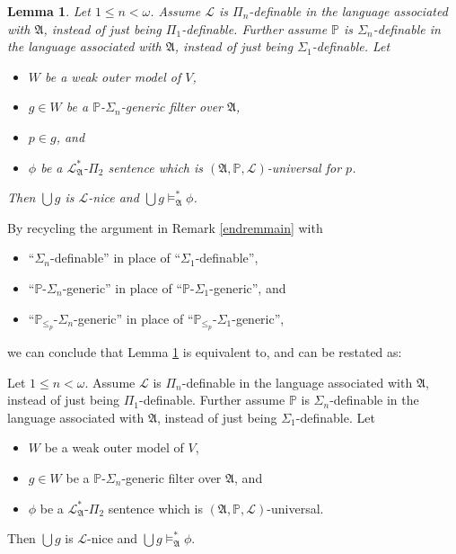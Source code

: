\documentclass[12pt, twoside]{memoir}
\numberwithin{equation}{section}
\newtheorem{lem}[thm]{Lemma}
\theoremstyle{definition}
\theoremstyle{remark}
\theoremstyle{definition}
\theoremstyle{definition}
\newenvironment{customlem}[1]
  {\renewcommand\theinnercustomlem{#1}\innercustomlem}
  {\endinnercustomlem}
\theoremstyle{definition}
\theoremstyle{remark}
\begin{document}
\begin{lem}\label{lem332}
Let $1 \leq n < \omega$. Assume $\mathcal{L}$ is $\Pi_n$-definable in the language associated with $\mathfrak{A}$, instead of just being $\Pi_1$-definable. Further assume $\mathbb{P}$ is $\Sigma_n$-definable in the language associated with $\mathfrak{A}$, instead of just being $\Sigma_1$-definable. Let 
\begin{itemize} 
    \item $W$ be a weak outer model of $V$,
    \item $g \in W$ be a $\mathbb{P}$-$\Sigma_n$-generic filter over $\mathfrak{A}$, 
    \item $p \in g$, and
    \item $\phi$ be a $\mathcal{L}^{*}_{\mathfrak{A}}$-$\Pi_2$ sentence which is $(\mathfrak{A}, \mathbb{P}, \mathcal{L})$-universal for $p$.
\end{itemize} 
Then $\bigcup g$ is $\mathcal{L}$-nice and $\bigcup g \models^{*}_{\mathfrak{A}} \phi$.
\end{lem}

By recycling the argument in Remark \ref{endremmain} with 
\begin{itemize}
    \item ``$\Sigma_n$-definable'' in place of ``$\Sigma_1$-definable'', 
    \item ``$\mathbb{P}$-$\Sigma_n$-generic'' in place of ``$\mathbb{P}$-$\Sigma_1$-generic'', and
    \item ``$\mathbb{P}_{\leq_p}$-$\Sigma_n$-generic'' in place of ``$\mathbb{P}_{\leq_p}$-$\Sigma_1$-generic'',
\end{itemize}
we can conclude that Lemma \ref{lem332} is equivalent to, and can be restated as:

\begin{customlem}{5.2.13$'$}\label{lem332p}
Let $1 \leq n < \omega$. Assume $\mathcal{L}$ is $\Pi_n$-definable in the language associated with $\mathfrak{A}$, instead of just being $\Pi_1$-definable. Further assume $\mathbb{P}$ is $\Sigma_n$-definable in the language associated with $\mathfrak{A}$, instead of just being $\Sigma_1$-definable. Let 
\begin{itemize} 
    \item $W$ be a weak outer model of $V$,
    \item $g \in W$ be a $\mathbb{P}$-$\Sigma_n$-generic filter over $\mathfrak{A}$, and
    \item $\phi$ be a $\mathcal{L}^{*}_{\mathfrak{A}}$-$\Pi_2$ sentence which is $(\mathfrak{A}, \mathbb{P}, \mathcal{L})$-universal.
\end{itemize} 
Then $\bigcup g$ is $\mathcal{L}$-nice and $\bigcup g \models^{*}_{\mathfrak{A}} \phi$.
\end{customlem}
\end{document}
